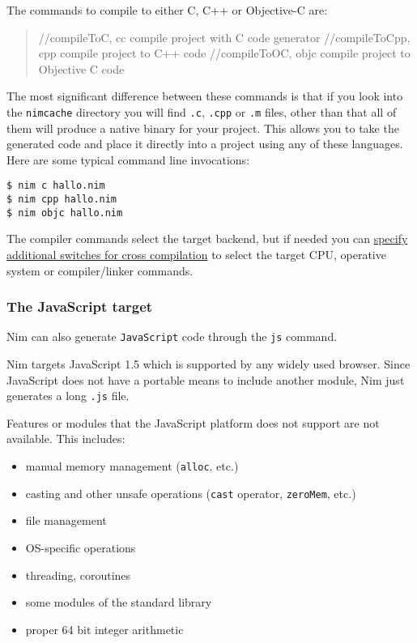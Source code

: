 The commands to compile to either C, C++ or Objective-C are:

\begin{quote}
//compileToC, cc compile project with C code generator //compileToCpp,
cpp compile project to C++ code //compileToOC, objc compile project to
Objective C code
\end{quote}

The most significant difference between these commands is that if you
look into the \texttt{nimcache} directory you will find \texttt{.c},
\texttt{.cpp} or \texttt{.m} files, other than that all of them will
produce a native binary for your project. This allows you to take the
generated code and place it directly into a project using any of these
languages. Here are some typical command line invocations:

\begin{verbatim}
$ nim c hallo.nim
$ nim cpp hallo.nim
$ nim objc hallo.nim
\end{verbatim}

The compiler commands select the target backend, but if needed you can
\href{nimc.html\#cross-compilation}{specify additional switches for
cross compilation} to select the target CPU, operative system or
compiler/linker commands.

\hypertarget{the-javascript-target}{%
\subsubsection{The JavaScript target}\label{the-javascript-target}}

Nim can also generate \texttt{JavaScript} code through the \texttt{js}
command.

Nim targets JavaScript 1.5 which is supported by any widely used
browser. Since JavaScript does not have a portable means to include
another module, Nim just generates a long \texttt{.js} file.

Features or modules that the JavaScript platform does not support are
not available. This includes:

\begin{itemize}
\tightlist
\item
  manual memory management (\texttt{alloc}, etc.)
\item
  casting and other unsafe operations (\texttt{cast} operator,
  \texttt{zeroMem}, etc.)
\item
  file management
\item
  OS-specific operations
\item
  threading, coroutines
\item
  some modules of the standard library
\item
  proper 64 bit integer arithmetic
\end{itemize}

